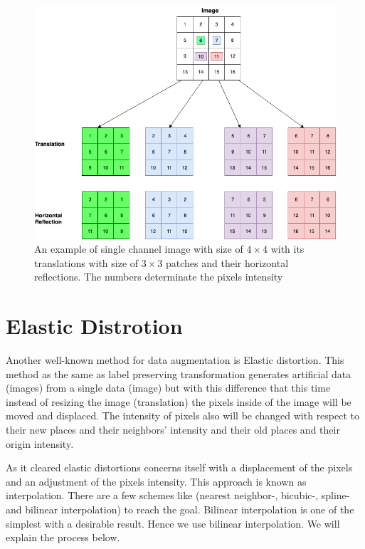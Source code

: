 \begin{figure}
  \centering
  \label{fig:label-preserving-trasformation}
  \includegraphics[width=1\textwidth]{fig/label-preserving-transformation}
  \caption{An example of single channel image with size of $4\times4$ with its translations with size of $3\times3$ patches and their horizontal reflections. The numbers determinate the pixels intensity}
\end{figure}


\section{Elastic Distrotion}
\label{tit:elastic-distrotion}
Another well-known method for data augmentation is Elastic distortion. This method as the same as label preserving transformation generates artificial data (images) from a single data (image) but with
this difference that this time instead of resizing the image (translation) the pixels inside of the image will be moved and displaced. The intensity of pixels also will be changed with respect to
their new places and their neighbors' intensity and their old places and their origin intensity.

As it cleared elastic distortions concerns itself with a displacement of the pixels and an adjustment of the pixels intensity. This approach is known as interpolation. There are a few schemes like
(nearest neighbor-, bicubic-,  spline- and bilinear interpolation) to reach the goal. Bilinear interpolation is one of the simplest with a desirable result. Hence we use bilinear interpolation. We
will explain the process below.


